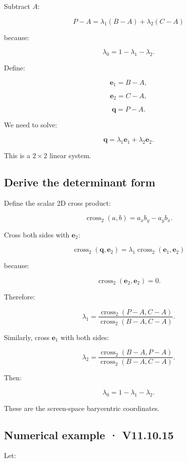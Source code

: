 Subtract \(A\):

\[
 P-A= \lambda_1(B-A)+\lambda_2(C-A)
\]

because:

\[
 \lambda_0=1-\lambda_1-\lambda_2.
\]

Define:

\[
 \mathbf e_1=B-A,
\]

\[
 \mathbf e_2=C-A,
\]

\[
 \mathbf q=P-A.
\]

We need to solve:

\[
 \mathbf q= \lambda_1\mathbf e_1+ \lambda_2\mathbf e_2.
\]

This is a \(2\times2\) linear system.

\subsection{Derive the determinant form}\label{02-foundations-ii-ch034-derive-the-determinant-form}

Define the scalar 2D cross product:

\[
 \boxed{ \operatorname{cross}_2(a,b)=a_xb_y-a_yb_x }.
\]

Cross both sides with \(\mathbf e_2\):

\[
 \operatorname{cross}_2(\mathbf q,\mathbf e_2) = \lambda_1 \operatorname{cross}_2(\mathbf e_1,\mathbf e_2)
\]

because:

\[
 \operatorname{cross}_2(\mathbf e_2,\mathbf e_2)=0.
\]

Therefore:

\[
 \boxed{ \lambda_1= \frac{ \operatorname{cross}_2(P-A,C-A) }{ \operatorname{cross}_2(B-A,C-A) } }.
\]

Similarly, cross \(\mathbf e_1\) with both sides:

\[
 \boxed{ \lambda_2= \frac{ \operatorname{cross}_2(B-A,P-A) }{ \operatorname{cross}_2(B-A,C-A) } }.
\]

Then:

\[
 \boxed{ \lambda_0=1-\lambda_1-\lambda_2 }.
\]

These are the screen-space barycentric coordinates.

\subsection{Numerical example · V11.10.15}\label{02-foundations-ii-ch034-numerical-example-v11.10.15}

Let:

